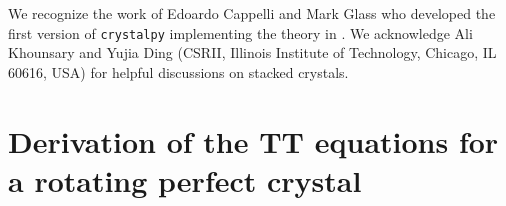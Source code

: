 \documentclass[preprint]{iucr}              %
\begin{document}
We recognize the work of Edoardo Cappelli and Mark Glass who developed the first version of {\tt crystalpy} implementing the theory in \cite{ZachariasenBook}. We acknowledge Ali Khounsary and Yujia Ding (CSRII, Illinois Institute of Technology, Chicago, IL 60616, USA) for helpful discussions on stacked crystals. 



\appendix

\section{Derivation of the TT equations for a rotating perfect crystal}
\label{appendix:rotating}
\end{document}
